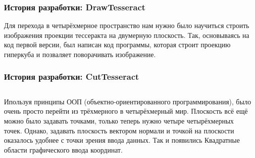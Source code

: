 \documentclass[10pt,pdf,hyperref={unicode}]{beamer}
\begin{document}
\begin{frame}
\frametitle{История разработки: {\bf DrawTesseract}}
	Для перехода в четырёхмерное пространство нам нужно 
	было научиться строить изображения проекции тессеракта на двумерную плоскость.
	Так, основываясь на код первой версии, был написан код программы, которая строит
	проекцию гиперкуба и позваляет поворачивать изображение.
\end{frame}

\begin{frame}
\frametitle{История разработки: {\bf CutTesseract}}
	\begin{columns}
		Ипользуя принципы ООП (объектно-ориентированного программирования),
		было очень просто перейти из трёхмерного в четырёхмерный мир. 
		Плоскость всё ещё можно было задавать точками, только теперь нужно
		четыре четырёхмерных точек. Однако, задавать плоскость вектором нормали
		и точкой на плоскости оказалось удобнее с точки зрения ввода данных.
		Так и появились Квадратные области графического ввода координат.
	\end{columns}
\end{frame}
\end{document}
